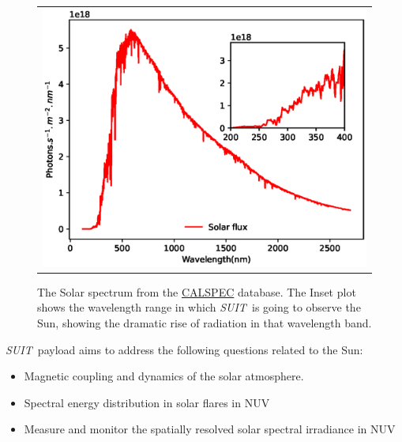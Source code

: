 \documentclass[12pt]{spieman}  %
\newcommand{\suit}{{\it SUIT~}}
\begin{document}
\begin{figure}[ht]
\begin{center}
\begin{tabular}{c}
\includegraphics[width=0.7\linewidth]{spectrum_sun.eps}
\end{tabular}
\end{center}
\caption 
{ \label{fig:sun_spec} The Solar spectrum from the \href{https://www.stsci.edu/hst/instrumentation/reference-data-for-calibration-and-tools/astronomical-catalogs/calspec}{CALSPEC} database. The Inset plot shows the wavelength range in which \suit is going to observe the Sun, showing the dramatic rise of radiation in that wavelength band.} 
\end{figure} 

\suit  payload aims to address the following questions related to the Sun:

\begin{itemize}
    \item Magnetic coupling and dynamics of the solar atmosphere.
    \item Spectral energy distribution in solar flares in NUV
    \item Measure and monitor the spatially resolved solar spectral irradiance in NUV
\end{itemize}
\end{document}
